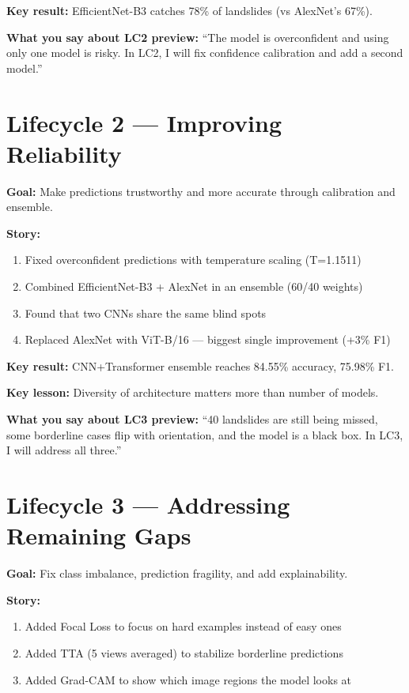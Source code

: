 \documentclass[11pt]{article}
\begin{document}
\textbf{Key result:} EfficientNet-B3 catches 78\% of landslides (vs AlexNet's 67\%).

\textbf{What you say about LC2 preview:} ``The model is overconfident and using only one model is risky. In LC2, I will fix confidence calibration and add a second model.''

\section{Lifecycle 2 --- Improving Reliability}

\textbf{Goal:} Make predictions trustworthy and more accurate through calibration and ensemble.

\textbf{Story:}
\begin{enumerate}[noitemsep]
    \item Fixed overconfident predictions with temperature scaling (T=1.1511)
    \item Combined EfficientNet-B3 + AlexNet in an ensemble (60/40 weights)
    \item Found that two CNNs share the same blind spots
    \item Replaced AlexNet with ViT-B/16 --- biggest single improvement (+3\% F1)
\end{enumerate}

\textbf{Key result:} CNN+Transformer ensemble reaches 84.55\% accuracy, 75.98\% F1.

\textbf{Key lesson:} Diversity of architecture matters more than number of models.

\textbf{What you say about LC3 preview:} ``40 landslides are still being missed, some borderline cases flip with orientation, and the model is a black box. In LC3, I will address all three.''

\section{Lifecycle 3 --- Addressing Remaining Gaps}

\textbf{Goal:} Fix class imbalance, prediction fragility, and add explainability.

\textbf{Story:}
\begin{enumerate}[noitemsep]
    \item Added Focal Loss to focus on hard examples instead of easy ones
    \item Added TTA (5 views averaged) to stabilize borderline predictions
    \item Added Grad-CAM to show which image regions the model looks at
\end{enumerate}
\end{document}
